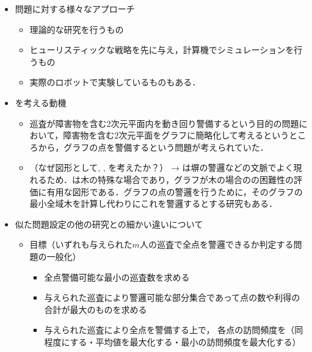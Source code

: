 \begin{itemize}
  \item 問題に対する様々なアプローチ
  \begin{itemize}
    \item 理論的な研究を行うもの\cite{}
    \item ヒューリスティックな戦略を先に与え，計算機でシミュレーションを行うもの\cite{}
    \item 実際のロボットで実験しているものもある\cite{}．
  \end{itemize}

  \item {\patProb}を考える動機
  \begin{itemize}
    \item 巡査が障害物を含む2次元平面内を動き回り警備するという目的の問題において，障害物を含む2次元平面をグラフに簡略化して考えるというところから，グラフの点を警備するという問題が考えられていた\cite{machado2002multi}．
    \item （なぜ図形として{\graphLine}, {\graphStar}, {\graphUnit}を考えたか？）
    → {\graphLine}は塀の警邏などの文脈でよく現れるため\cite{}．{\graphStar}は木の特殊な場合であり，グラフが木の場合の{\patProb}の困難性の評価に有用な図形である．グラフの点の警邏を行うために，そのグラフの最小全域木を計算し代わりにこれを警邏するとする研究もある\cite{}．
  \end{itemize}

  \item 似た問題設定の他の研究との細かい違いについて
  \begin{itemize}
    \item 目標（いずれも与えられた$m$人の巡査で全点を警邏できるか判定する問題の一般化）
    \begin{itemize}
      \item 全点警備可能な最小の巡査数を求める\cite{} \cite{GORAIN2015712}
      \item 与えられた巡査により警邏可能な部分集合であって点の数や利得の合計が最大のものを求める\cite{}
      \item 与えられた巡査により全点を警備する上で，
      各点の訪問頻度を（同程度にする・平均値を最大化する・最小の訪問頻度を最大化する）\cite{}
    \end{itemize}
  \end{itemize}



\end{itemize}
